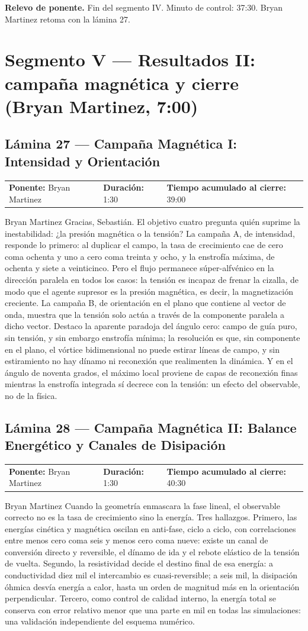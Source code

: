 \documentclass[11pt,letterpaper]{article}
\makeatletter
\newcommand{\lamina}[5]{%
  \subsection*{Lámina #1 --- #2}
  \noindent
  \begin{tabular}{@{}llll@{}}
    \textbf{Ponente:} #3 &\quad \textbf{Duración:} #4 &\quad
    \textbf{Tiempo acumulado al cierre:} #5 &
  \end{tabular}
  \vspace{2pt}}
\newcommand{\relevo}[1]{%
  \begin{center}
  \begin{tcolorbox}[colback=gold!20,colframe=gold!80!black,boxrule=0.6pt,
    width=0.92\linewidth,arc=1.5pt,left=6pt,right=6pt,top=4pt,bottom=4pt]
    \small\textbf{Relevo de ponente.} #1
  \end{tcolorbox}
  \end{center}}
\makeatother
\begin{document}
\relevo{Fin del segmento IV. Minuto de control: 37:30. Bryan Martinez
retoma con la lámina 27.}

\section{Segmento V --- Resultados II: campaña magnética y cierre (Bryan Martinez, 7:00)}

\lamina{27}{Campaña Magnética I: Intensidad y Orientación}{Bryan Martinez}{1:30}{39:00}

\begin{parlamento}{Bryan Martinez}
Gracias, Sebastián. El objetivo cuatro pregunta quién suprime la inestabilidad:
¿la presión magnética o la tensión? La campaña A, de intensidad, responde
lo primero: al duplicar el campo, la tasa de crecimiento cae de cero coma
ochenta y uno a cero coma treinta y ocho, y la enstrofía máxima, de
ochenta y siete a veinticinco. Pero el flujo permanece súper-alfvénico en
la dirección paralela en todos los casos: la tensión es incapaz de frenar
la cizalla, de modo que el agente supresor es la presión magnética, es
decir, la magnetización creciente. La campaña B, de orientación en el
plano que contiene al vector de onda, muestra que la tensión solo actúa a
través de la componente paralela a dicho vector. Destaco la aparente
paradoja del ángulo cero: campo de guía puro, sin tensión, y sin embargo
enstrofía mínima; la resolución es que, sin componente en el plano, el
vórtice bidimensional no puede estirar líneas de campo, y sin estiramiento
no hay dínamo ni reconexión que realimenten la dinámica. Y en el ángulo de
noventa grados, el máximo local proviene de capas de reconexión finas
mientras la enstrofía integrada sí decrece con la tensión: un efecto del
observable, no de la física.
\end{parlamento}

\lamina{28}{Campaña Magnética II: Balance Energético y Canales de Disipación}{Bryan Martinez}{1:30}{40:30}

\begin{parlamento}{Bryan Martinez}
Cuando la geometría enmascara la fase lineal, el observable correcto no es
la tasa de crecimiento sino la energía. Tres hallazgos. Primero, las
energías cinética y magnética oscilan en anti-fase, ciclo a ciclo, con
correlaciones entre menos cero coma seis y menos cero coma nueve: existe
un canal de conversión directo y reversible, el dínamo de ida y el rebote
elástico de la tensión de vuelta. Segundo, la resistividad decide el
destino final de esa energía: a conductividad diez mil el intercambio es
cuasi-reversible; a seis mil, la disipación óhmica desvía energía a calor,
hasta un orden de magnitud más en la orientación perpendicular. Tercero,
como control de calidad interno, la energía total se conserva con error
relativo menor que una parte en mil en todas las simulaciones: una
validación independiente del esquema numérico.
\end{parlamento}
\end{document}
